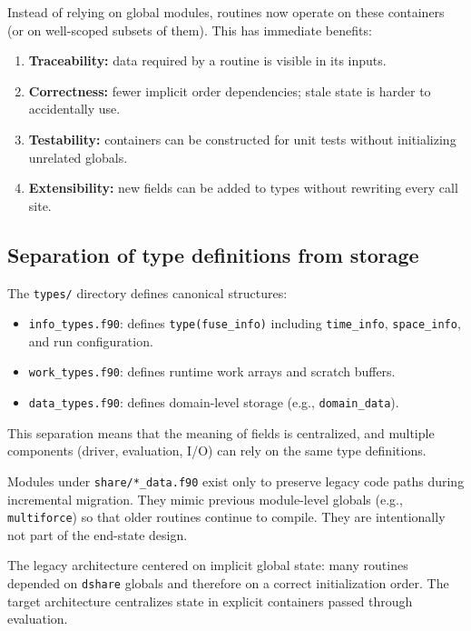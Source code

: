\documentclass[11pt]{scrartcl}
\begin{document}
Instead of relying on global modules, routines now operate on these containers (or
on well-scoped subsets of them). This has immediate benefits:

\begin{enumerate}[leftmargin=*]
\item \textbf{Traceability:} data required by a routine is visible in its inputs.
\item \textbf{Correctness:} fewer implicit order dependencies; stale state is harder to accidentally use.
\item \textbf{Testability:} containers can be constructed for unit tests without initializing unrelated globals.
\item \textbf{Extensibility:} new fields can be added to types without rewriting every call site.
\end{enumerate}

\subsection{Separation of type definitions from storage}

The \texttt{types/} directory defines canonical structures:
\begin{itemize}[leftmargin=*]
\item \texttt{info\_types.f90}: defines \texttt{type(fuse\_info)} including \texttt{time\_info},
      \texttt{space\_info}, and run configuration.
\item \texttt{work\_types.f90}: defines runtime work arrays and scratch buffers.
\item \texttt{data\_types.f90}: defines domain-level storage (e.g., \texttt{domain\_data}).
\end{itemize}

This separation means that the meaning of fields is centralized, and multiple components
(driver, evaluation, I/O) can rely on the same type definitions.

Modules under \texttt{share/*\_data.f90} exist only to preserve legacy code paths
during incremental migration. They mimic previous module-level globals (e.g., \texttt{multiforce})
so that older routines continue to compile. They are intentionally not part of the end-state design.

The legacy architecture centered on implicit global state: many routines depended on
\texttt{dshare} globals and therefore on a correct initialization order. The target
architecture centralizes state in explicit containers passed through evaluation.
\end{document}
